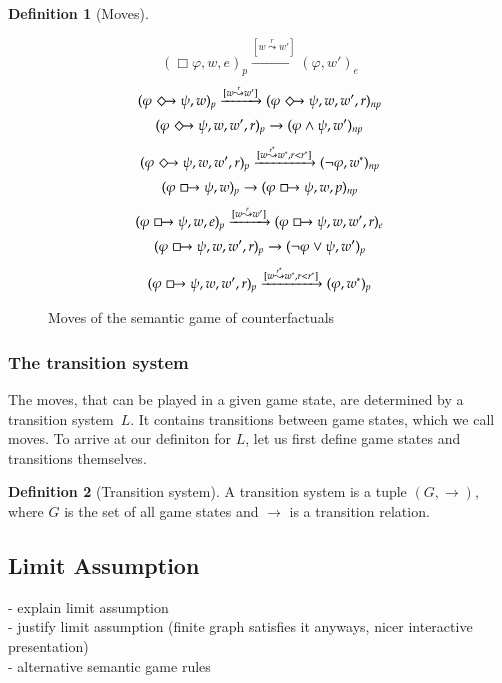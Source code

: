 \documentclass[a4paper,american]{paper}
\theoremstyle{definition}\newtheorem{definition}{Definition}
\begin{document}
\begin{definition}[Moves]
\begin{figure}[H]
\begin{equation}
		(\Box\varphi ,w,e)_{p}\xrightarrow{[w\overset{r}{\leadsto}w']} (\varphi ,w')_{e}
	\end{equation}
	\begin{equation}
		(\varphi\Diamondright\psi ,w)_{p}\xrightarrow{[w\overset{r}{\leadsto}w']} (\varphi\Diamondright\psi ,w,w',r)_{np}
	\end{equation}
	\begin{equation}
		(\varphi\Diamondright\psi ,w,w',r)_{p}\rightarrow (\varphi\wedge\psi ,w')_{np}
	\end{equation}
	\begin{equation}
		(\varphi\Diamondright\psi ,w,w',r)_{p}\xrightarrow{[w\overset{r^*}{\leadsto}w^*, r<r^*]} (\neg\varphi ,w^*)_{np}
	\end{equation}
	\begin{equation}
		(\varphi\boxright\psi ,w)_{p}\rightarrow (\varphi\boxright\psi ,w,p)_{np}
	\end{equation}
	\begin{equation}
		(\varphi\boxright\psi ,w,e)_{p}\xrightarrow{[w\overset{r}{\leadsto}w']} (\varphi\boxright\psi ,w,w',r)_{e}
	\end{equation}
	\begin{equation}
		(\varphi\boxright\psi ,w,w',r)_{p}\rightarrow (\neg\varphi\vee\psi ,w')_{p}
	\end{equation}
	\begin{equation}
		(\varphi\boxright\psi ,w,w',r)_{p}\xrightarrow{[w\overset{r^*}{\leadsto}w^*, r<r^*]} (\varphi ,w^*)_{p}
	\end{equation}
	\caption{Moves of the semantic game of counterfactuals}
	\label{fig:win_rules}
\end{figure}
\end{definition}
\subsubsection{The transition system}
The moves, that can be played in a given game state, are determined by a transition system~$L$. It contains transitions between game states, which we call moves. To arrive at our definiton for $L$, let us first define game states and transitions themselves.
\begin{definition}[Transition system]
A transition system is a tuple $(G,\rightarrow )$, where $G$ is the set of all game states and $\rightarrow$ is a transition relation.
\end{definition}
\subsection{Limit Assumption}
- explain limit assumption\\
- justify limit assumption (finite graph satisfies it anyways, nicer interactive presentation)\\
- alternative semantic game rules
\end{document}

